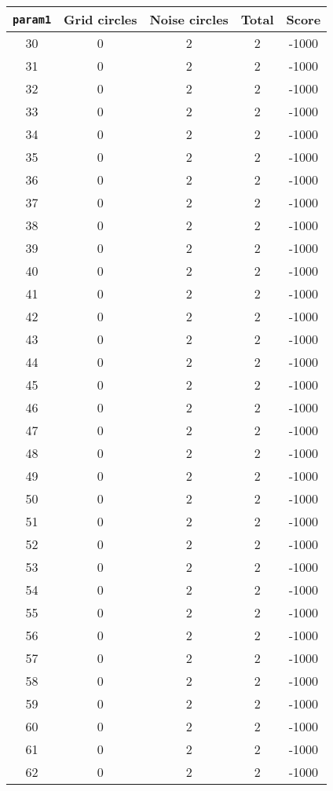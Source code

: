 \documentclass[letterpaper, 12pt]{article}
\begin{document}
\begin{longtable}{|c|c|c|c|c|}
\hline
\textbf{\texttt{param1}} & \textbf{Grid circles} & \textbf{Noise circles} & \textbf{Total} & \textbf{Score} \\
\hline
30 & 0 & 2 & 2 & -1000 \\
\hline
31 & 0 & 2 & 2 & -1000 \\
\hline
32 & 0 & 2 & 2 & -1000 \\
\hline
33 & 0 & 2 & 2 & -1000 \\
\hline
34 & 0 & 2 & 2 & -1000 \\
\hline
35 & 0 & 2 & 2 & -1000 \\
\hline
36 & 0 & 2 & 2 & -1000 \\
\hline
37 & 0 & 2 & 2 & -1000 \\
\hline
38 & 0 & 2 & 2 & -1000 \\
\hline
39 & 0 & 2 & 2 & -1000 \\
\hline
40 & 0 & 2 & 2 & -1000 \\
\hline
41 & 0 & 2 & 2 & -1000 \\
\hline
42 & 0 & 2 & 2 & -1000 \\
\hline
43 & 0 & 2 & 2 & -1000 \\
\hline
44 & 0 & 2 & 2 & -1000 \\
\hline
45 & 0 & 2 & 2 & -1000 \\
\hline
46 & 0 & 2 & 2 & -1000 \\
\hline
47 & 0 & 2 & 2 & -1000 \\
\hline
48 & 0 & 2 & 2 & -1000 \\
\hline
49 & 0 & 2 & 2 & -1000 \\
\hline
50 & 0 & 2 & 2 & -1000 \\
\hline
51 & 0 & 2 & 2 & -1000 \\
\hline
52 & 0 & 2 & 2 & -1000 \\
\hline
53 & 0 & 2 & 2 & -1000 \\
\hline
54 & 0 & 2 & 2 & -1000 \\
\hline
55 & 0 & 2 & 2 & -1000 \\
\hline
56 & 0 & 2 & 2 & -1000 \\
\hline
57 & 0 & 2 & 2 & -1000 \\
\hline
58 & 0 & 2 & 2 & -1000 \\
\hline
59 & 0 & 2 & 2 & -1000 \\
\hline
60 & 0 & 2 & 2 & -1000 \\
\hline
61 & 0 & 2 & 2 & -1000 \\
\hline
62 & 0 & 2 & 2 & -1000 \\

\end{longtable}
\end{document}
